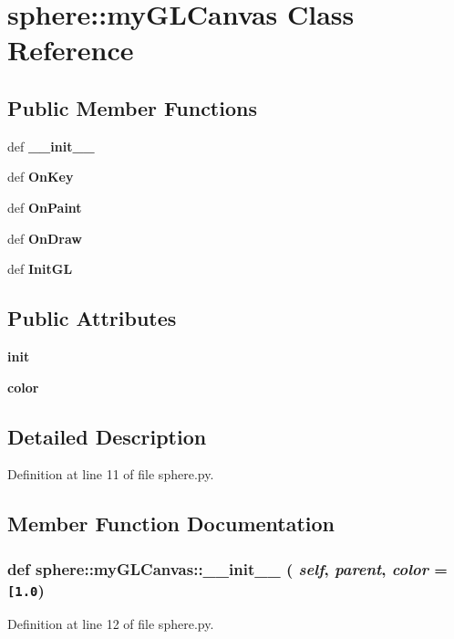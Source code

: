 \section{sphere::myGLCanvas Class Reference}
\label{classsphere_1_1myGLCanvas}
\subsection*{Public Member Functions}
\begin{CompactItemize}
\item 
def {\bf \_\-\_\-init\_\-\_\-}
\item 
def {\bf OnKey}
\item 
def {\bf OnPaint}
\item 
def {\bf OnDraw}
\item 
def {\bf InitGL}
\end{CompactItemize}
\subsection*{Public Attributes}
\begin{CompactItemize}
\item 
{\bf init}
\item 
{\bf color}
\end{CompactItemize}


\subsection{Detailed Description}


Definition at line 11 of file sphere.py.

\subsection{Member Function Documentation}
\subsubsection{\setlength{\rightskip}{0pt plus 5cm}def sphere::myGLCanvas::\_\-\_\-init\_\-\_\- ( {\em self},  {\em parent},  {\em color} = {\tt [1.0})}\label{classsphere_1_1myGLCanvas_ef6a033d74bd0f309206688754207b43}




Definition at line 12 of file sphere.py.
